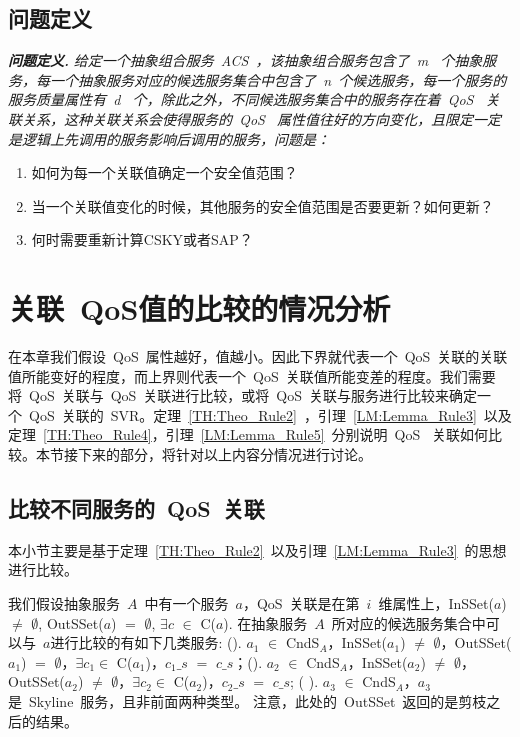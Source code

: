 \subsection{问题定义}

\textbf{\emph{问题定义.}} \emph{给定一个抽象组合服务~\emph{ACS}~，该抽象组合服务包含了~m~ 个抽象服务，每一个抽象服务对应的候选服务集合中包含了~n~个候选服务，每一个服务的服务质量属性有~d~ 个，除此之外，不同候选服务集合中的服务存在着~\emph{QoS}~ 关联关系，这种关联关系会使得服务的~\emph{QoS}~ 属性值往好的方向变化，且限定一定是逻辑上先调用的服务影响后调用的服务，问题是：}
\begin{enumerate}
  \item 如何为每一个关联值确定一个安全值范围？
  \item 当一个关联值变化的时候，其他服务的安全值范围是否要更新？如何更新？
  \item 何时需要重新计算CSKY或者SAP？
\end{enumerate}

\section{关联~QoS值的比较的情况分析}

在本章我们假设~QoS~属性越好，值越小。因此下界就代表一个~QoS~关联的关联值所能变好的程度，而上界则代表一个~QoS~关联值所能变差的程度。我们需要将~QoS~关联与~QoS~关联进行比较，或将~QoS~关联与服务进行比较来确定一个~QoS~关联的~SVR。定理~\ref{TH:Theo_Rule2}~，引理~\ref{LM:Lemma_Rule3}~以及定理~\ref{TH:Theo_Rule4}，引理~\ref{LM:Lemma_Rule5}~分别说明~QoS~ 关联如何比较。本节接下来的部分，将针对以上内容分情况进行讨论。

\subsection{比较不同服务的~QoS~关联}
本小节主要是基于定理~\ref{TH:Theo_Rule2}~以及引理~\ref{LM:Lemma_Rule3}~的思想进行比较。

我们假设抽象服务~$A$~中有一个服务~$a$，QoS~关联是在第~$i$~维属性上，InSSet($a$) $\neq$ $\emptyset$, OutSSet($a$) $=$ $\emptyset$, $\exists c$ $\in$ C($a$). 在抽象服务~$A$~所对应的候选服务集合中可以与~$a$进行比较的有如下几类服务: (). $a_{1}$ $\in$ CndS$_{A}$，InSSet($a_{1}$) $\neq$ $\emptyset$，OutSSet($a_{1}$) $=$ $\emptyset$，$\exists c_{1} \in$ C($a_{1}$)，$c_{1}\_s$ $=$ $c\_s$；(). $a_{2}$ $\in$ CndS$_{A}$，InSSet($a_{2}$) $\neq$ $\emptyset$，OutSSet($a_{2}$) $\neq$ $\emptyset$，$\exists c_{2} \in$ C($a_{2}$)，$c_{2}\_s$ $=$ $c\_s$; ( ). $a_{3}$ $\in$ CndS$_{A}$，$a_{3}$是~Skyline~服务，且非前面两种类型。 注意，此处的~OutSSet~返回的是剪枝之后的结果。

